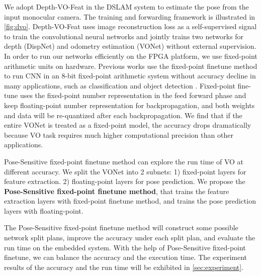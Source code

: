 We adopt Depth-VO-Feat \cite{Zhan:2018e92} in the DSLAM system to estimate the pose from the input monocular camera. The training and forwarding framework is illustrated in \cref{fig:dvo}. Depth-VO-Feat uses image reconstruction loss as a self-supervised signal to train the convolutional neural networks and jointly trains two networks for depth (DispNet) and odometry estimation (VONet) without external supervision. In order to run our networks efficiently on the FPGA platform, we use fixed-point arithmetic units on hardware. Previous works use the fixed-point finetune method \cite{Yu:2018:IDC:3299999.3283452} to run CNN in an 8-bit fixed-point arithmetic system without accuracy decline in many applications, such as classification \cite{Qiu:2016151} and object detection \cite{Yu:2018:IDC:3299999.3283452}. Fixed-point fine-tune uses the fixed-point number representation in the feed forward phase and keep floating-point number representation for backpropagation, and both weights and data will be re-quantized after each backpropagation. We find that if the entire VONet is treated as a fixed-point model, the accuracy drops dramatically because VO task requires much higher computational precision than other applications.

Pose-Sensitive fixed-point finetune method can explore the run time of VO at different accuracy. 
We split the VONet into 2 subnets: 1) fixed-point layers for feature extraction. 2) floating-point layers for pose prediction. We propose the \textbf{Pose-Sensitive fixed-point finetune method}, that trains the feature extraction layers with fixed-point finetune method, and trains the pose prediction layers with floating-point.

The Pose-Sensitive fixed-point finetune method will construct some possible network split plans, improve the accuracy under each split plan, and evaluate the run time on the embedded system. With the help of Pose-Sensitive fixed-point finetune, we can balance the accuracy and the execution time. The experiment results of the accuracy and the run time will be exhibited in \cref{sec:experiment}.






